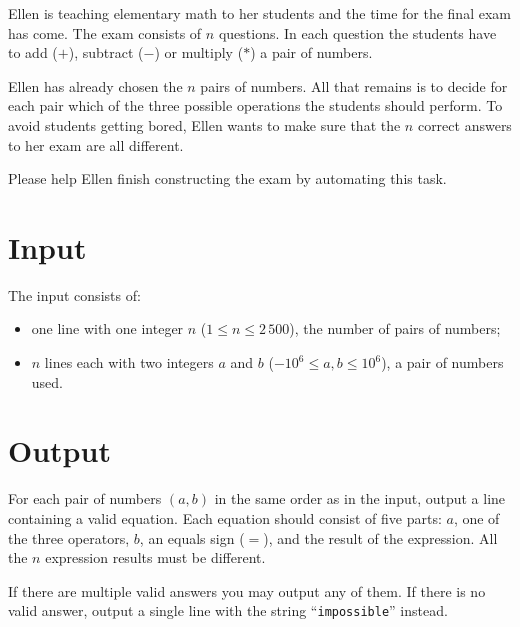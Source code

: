 
%
Ellen is teaching elementary math to her students and the time for the final exam has
come. The exam consists of $n$ questions. In each question the students have to
add ($+$), subtract ($-$) or multiply ($*$) a pair of numbers.

Ellen has already chosen the $n$ pairs of numbers. All that remains is to decide
for each pair which of the three possible operations the students should perform.
To avoid students getting bored, Ellen wants to make sure that the $n$ correct answers
to her exam are all different.

Please help Ellen finish constructing the exam by automating this task.

\section*{Input}

The input consists of:
\begin{itemize}
   \item one line with one integer $n$ ($1\leq n \leq 2\,500$), the number of pairs of numbers;
   \item $n$ lines each with two integers $a$ and $b$ ($-10^6 \leq a, b \leq 10^6$), a pair of numbers used.
\end{itemize}

\section*{Output}

For each pair of numbers $(a,b)$ in the same order as in the input,
output a line containing a valid equation.
Each equation should consist of five parts: $a$, one of the three operators, $b$,
an equals sign ($=$), and the result of the expression.
All the $n$ expression results must be different.

If there are multiple valid answers you may output any of them.
If there is no valid answer, output a single line with the string ``\texttt{impossible}'' instead.

